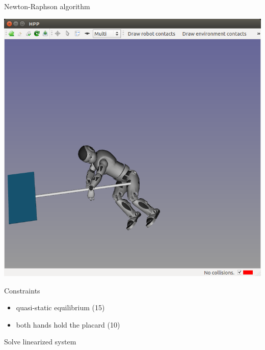 \begin {frame} {Newton-Raphson algorithm}
  \parbox {.5\linewidth} {
    \centerline {
      \includegraphics [width=\linewidth] {figures/seq/romeo-2.png}
    }
  }
  \hspace*{.05\linewidth}
  \parbox {.39\linewidth} {
    Constraints
    \begin {itemize}
    \item quasi-static equilibrium (15)
    \item both hands hold the placard (10)
    \end{itemize}
  }
  \centerline {
    Solve linearized system
  }
\end {frame}

